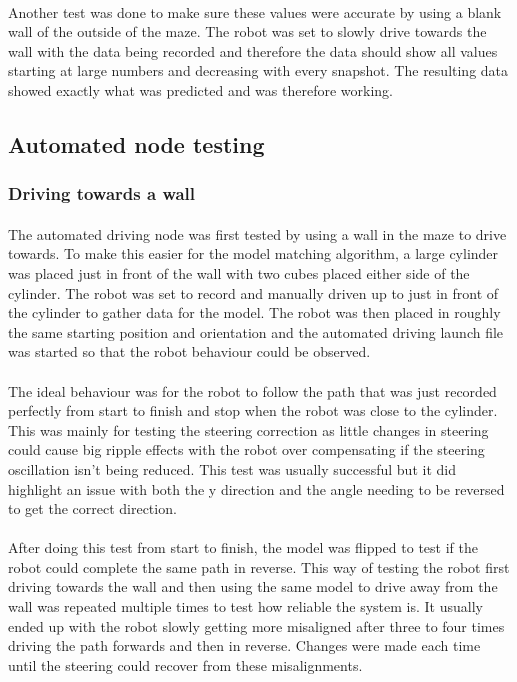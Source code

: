 \paragraph{}
Another test was done to make sure these values were accurate by using a blank wall of the outside of the maze. The robot was set to slowly drive towards the wall with the data being recorded and therefore the data should show all values starting at large numbers and decreasing with every snapshot. The resulting data showed exactly what was predicted and was therefore working.


\subsection{Automated node testing}
\subsubsection{Driving towards a wall}
\paragraph{}
The automated driving node was first tested by using a wall in the maze to drive towards. To make this easier for the model matching algorithm, a large cylinder was placed just in front of the wall with two cubes placed either side of the cylinder. The robot was set to record and manually driven up to just in front of the cylinder to gather data for the model. The robot was then placed in roughly the same starting position and orientation and the automated driving launch file was started so that the robot behaviour could be observed.

\paragraph{}
The ideal behaviour was for the robot to follow the path that was just recorded perfectly from start to finish and stop when the robot was close to the cylinder. This was mainly for testing the steering correction as little changes in steering could cause big ripple effects with the robot over compensating if the steering oscillation isn't being reduced. This test was usually successful but it did highlight an issue with both the y direction and the angle needing to be reversed to get the correct direction.

\paragraph{}
After doing this test from start to finish, the model was flipped to test if the robot could complete the same path in reverse. This way of testing the robot first driving towards the wall and then using the same model to drive away from the wall was repeated multiple times to test how reliable the system is. It usually ended up with the robot slowly getting more misaligned after three to four times driving the path forwards and then in reverse. Changes were made each time until the steering could recover from these misalignments.


